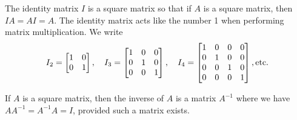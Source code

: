 \begin{definition}[$I_n$ and $A^{-1}$]
 The identity matrix $I$ is a square matrix so that if $A$ is a square matrix, then $IA=AI=A$. The identity matrix acts like the number 1 when performing matrix multiplication. We write 
$$I_2 = \begin{bmatrix} 1&0\\0&1 \end{bmatrix}, 
\quad I_3 = \begin{bmatrix} 1&0&0\\0&1&0\\0&0&1 \end{bmatrix},
\quad I_4 = \begin{bmatrix} 1&0&0&0\\0&1&0&0\\0&0&1&0\\0&0&0&1 \end{bmatrix},
 \text{etc.}$$ 

 If $A$ is a square matrix, then the inverse of $A$ is a matrix $A^{-1}$ where we have $AA^{-1}=A^{-1}A=I$, provided such a matrix exists.
\end{definition}



